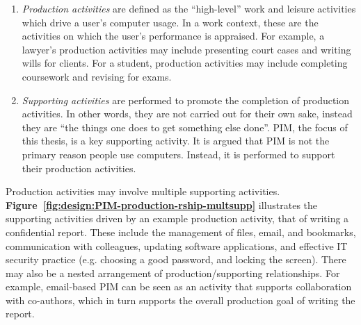 \begin{enumerate}

\item \textit{Production activities} are defined as the ``high-level'' work and leisure activities which drive a user's computer usage.  In a work context, these are the activities on which the user's performance is appraised. For example, a lawyer's production activities may include presenting court cases and writing wills for clients.  For a student, production activities may include completing coursework and revising for exams.

\item \textit{Supporting activities} are performed to promote the completion of production activities.  In other words, they are not carried out for their own sake, instead they are ``the things one does to get something else done''.  PIM, the focus of this thesis, is a key supporting activity.  It is argued that PIM is not the primary reason people use computers.  Instead, it is performed to support their production activities.

\end{enumerate}

Production activities may involve multiple supporting activities.  \textbf{Figure~\ref{fig:design:PIM-production-rship-multsupp}} illustrates the supporting activities driven by an example production activity, that of writing a confidential report. These include the management of files, email, and bookmarks, communication with colleagues, updating software applications, and effective IT security practice (e.g. choosing a good password, and locking the screen).  %
There may also be a nested arrangement of production/supporting relationships.  For example, email-based PIM can be seen as an activity that supports collaboration with co-authors, which in turn supports the overall production goal of writing the report.

